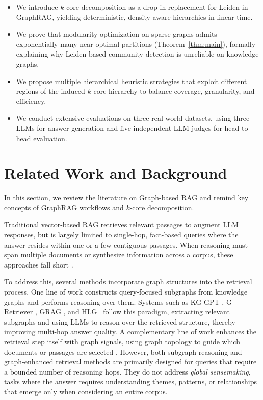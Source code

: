 \documentclass[sigconf]{acmart}
\begin{document}
\begin{itemize}
\item We introduce $k$-core decomposition as a drop-in replacement for Leiden in GraphRAG, yielding deterministic, density-aware hierarchies in linear time.
\item We prove that modularity optimization on sparse graphs admits exponentially many near-optimal partitions (Theorem~\ref{thm:main}), formally explaining why Leiden-based community detection is unreliable on knowledge graphs.
\item We propose multiple hierarchical heuristic strategies that exploit different regions of the induced $k$-core hierarchy to balance coverage, granularity, and efficiency.
\item We conduct extensive evaluations on three real-world datasets, using three LLMs for answer generation and five independent LLM judges for head-to-head evaluation.
\end{itemize}


\section{Related Work and Background}\label{sec:back}

In this section, we review the literature on Graph-based RAG and remind key concepts of GraphRAG workflows and $k$-core decomposition.

 Traditional vector-based RAG retrieves relevant passages to augment LLM responses, but is largely limited to single-hop, fact-based queries where the answer resides within one or a few contiguous passages. When reasoning must span multiple documents or synthesize information across a corpus, these approaches fall short \cite{han2025, peng25}.

To address this, several methods incorporate graph structures into the retrieval process. One line of work constructs query-focused subgraphs from knowledge graphs and performs reasoning over them. Systems such as KG-GPT \cite{kim23}, G-Retriever \cite{he24}, GRAG \cite{hu25}, and HLG~\cite{Ghassel25} follow this paradigm, extracting relevant subgraphs and using LLMs to reason over the retrieved structure, thereby improving multi-hop answer quality. A complementary line of work enhances the retrieval step itself with graph signals, using graph topology to guide which documents or passages are selected \cite{sun23,wang24,peng25}.
However, both subgraph-reasoning and graph-enhanced retrieval methods are primarily designed for queries that require a bounded number of reasoning hops. They do not address \emph{global sensemaking}, tasks where the answer requires understanding themes, patterns, or relationships that emerge only when considering an entire corpus.
\end{document}
